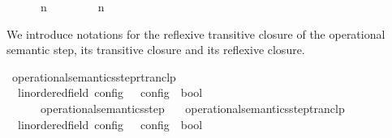 \begin{isabellebody}
\ \ \ \ {\isasymLongrightarrow}\ {\isacharparenleft}{\isasymGamma}\ n\ {\isasymturnstile}\ {\isasymPsi}\ {\isasymtriangleright}\ {\isasymPhi}\ \ {\isasymhookrightarrow}\ \ {\isacharparenleft}{\isasymGamma}\ n\ {\isasymturnstile}\ {\isasymPsi}\ {\isasymtriangleright}\ {\isasymPhi}%
\begin{isamarkuptext}%
We introduce notations for the reflexive transitive closure of the operational 
  semantic step, its transitive closure and its reflexive closure.%
\end{isamarkuptext}\isamarkuptrue%
\isamarkupfalse%
\ operational{\isacharunderscore}semantics{\isacharunderscore}step{\isacharunderscore}rtranclp\isanewline
\ \ {\isacharcolon}{\isacharcolon}{\isacartoucheopen}{\isacharparenleft}{\isacharprime}{\isasymtau}{\isacharcolon}{\isacharcolon}linordered{\isacharunderscore}field{\isacharparenright}\ config\ {\isasymRightarrow}\ {\isacharprime}{\isasymtau}\ config\ {\isasymRightarrow}\ bool{\isacartoucheclose}\ \ \ \ \ \ \ \ \ \ \ \ \ \ {\isacharparenleft}{\isacartoucheopen}{\isacharunderscore}\ {\isasymhookrightarrow}\isactrlsup {\isacharasterisk}\isactrlsup {\isacharasterisk}\ {\isacharunderscore}{\isacartoucheclose}\ {}{}{\isacharparenright}\isanewline
{}\isanewline
\ \ {\isacartoucheopen}{\isasymC}\ {\isasymhookrightarrow}\isactrlsup {\isacharasterisk}\isactrlsup {\isacharasterisk}\ {\isasymC}\ {\isasymequiv}\ operational{\isacharunderscore}semantics{\isacharunderscore}step\isactrlsup {\isacharasterisk}\isactrlsup {\isacharasterisk}\ {\isasymC}\ {\isasymC}\isanewline
\isanewline
{}\isamarkupfalse%
\ operational{\isacharunderscore}semantics{\isacharunderscore}step{\isacharunderscore}tranclp\isanewline
\ \ {\isacharcolon}{\isacharcolon}{\isacartoucheopen}{\isacharparenleft}{\isacharprime}{\isasymtau}{\isacharcolon}{\isacharcolon}linordered{\isacharunderscore}field{\isacharparenright}\ config\ {\isasymRightarrow}\ {\isacharprime}{\isasymtau}\ config\ {\isasymRightarrow}\ bool{\isacartoucheclose}\ \ \ \ \ \ \ \ \ \ \ \ \ \ {\isacharparenleft}{\isacartoucheopen}{\isacharunderscore}\ {\isasymhookrightarrow}\isactrlsup {\isacharplus}\isactrlsup {\isacharplus}\ {\isacharunderscore}{\isacartoucheclose}\ {}{}{\isacharparenright}\isanewline

\end{isabellebody}
